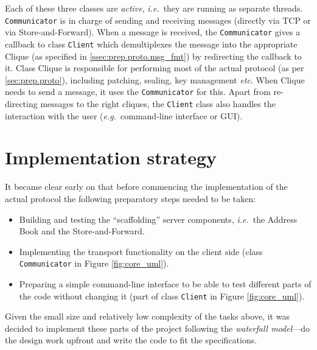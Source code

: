 \documentclass[a4paper, twoside, 12pt]{report}
\begin{document}
Each of these three classes are \emph{active}, \textit{i.e.}~they are running as separate threads. \texttt{Communicator} is in charge of sending and receiving messages (directly via TCP or via Store-and-Forward). When a message is received, the \texttt{Communicator} gives a callback to class \texttt{Client} which demultiplexes the message into the appropriate Clique (as specified in \cref{ssec:prep.proto.msg_fmt}) by redirecting the callback to it. Class Clique is responsible for performing most of the actual protocol (as per \cref{sec:prep.proto}), including patching, sealing, key management \textit{etc}. When Clique needs to send a message, it uses the \texttt{Communicator} for this. Apart from re-directing messages to the right cliques, the \texttt{Client} class also handles the interaction with the user (\textit{e.g.}~command-line interface or GUI).

\section{Implementation strategy}
\label{sec:prep.impl_strat}
It became clear early on that before commencing the implementation of the actual protocol the following preparatory steps needed to be taken:
\begin{itemize}
    \item Building and testing the ``scaffolding'' server components, \textit{i.e.}~the Address Book and the Store-and-Forward.
    \item Implementing the transport functionality on the client side (class \texttt{Communicator} in Figure \ref{fig:core_uml}).
    \item Preparing a simple command-line interface to be able to test different parts of the code without changing it (part of class \texttt{Client} in Figure \ref{fig:core_uml}).
\end{itemize}

Given the small size and relatively low complexity of the tasks above, it was decided to implement these parts of the project following the \emph{waterfall model}---do the design work upfront and write the code to fit the specifications. \\
\end{document}
